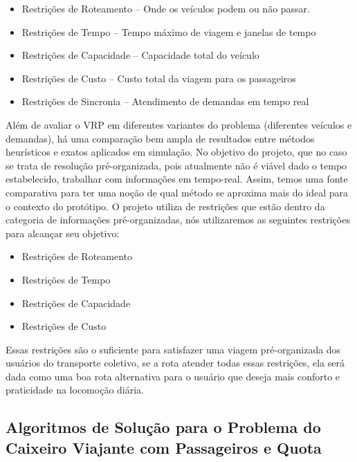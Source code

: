 \begin{itemize}
\item Restrições de Roteamento -- Onde os veículos podem ou não passar.
\item Restrições de Tempo -- Tempo máximo de viagem e janelas de tempo
\item Restrições de Capacidade -- Capacidade total do veículo
\item Restrições de Custo -- Custo total da viagem para os passageiros
\item Restrições de Sincronia -- Atendimento de demandas em tempo real
\end{itemize}

 Além de avaliar o VRP em diferentes variantes do problema (diferentes veículos e demandas), há uma comparação bem ampla de resultados entre métodos heurísticos e exatos aplicados em simulação. No objetivo do projeto, que no caso se trata de resolução pré-organizada, pois atualmente não é viável dado o tempo estabelecido, trabalhar com informações em tempo-real. Assim, temos uma fonte comparativa para ter uma noção de qual método se aproxima mais do ideal para o contexto do protótipo. O projeto utiliza de restrições que estão dentro da categoria de informações pré-organizadas, nós utilizaremos as seguintes restrições para alcançar seu objetivo:

\begin{itemize}
\item Restrições de Roteamento
\item Restrições de Tempo
\item Restrições de Capacidade
\item Restrições de Custo
\end{itemize}

Essas restrições são o suficiente para satisfazer uma viagem pré-organizada dos usuários do transporte coletivo, se a rota atender todas essas restrições, ela será dada como uma boa rota alternativa para o usuário que deseja mais conforto e praticidade na locomoção diária.

 
 \subsection{Algoritmos de Solução para o Problema do Caixeiro Viajante com Passageiros e Quota \cite{silva2017algoritmos}}
 
